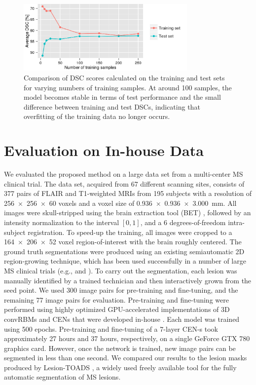 \begin{figure}[tb]
\centering
\includegraphics[width=0.78\textwidth]{figures/MICCAI2015_train_count}

\caption[Comparison of DSC scores calculated on the training and test sets for
varying numbers of training samples]{Comparison of DSC scores calculated on the training and test sets for
varying numbers of training samples. At around 100 samples, the model becomes
stable in terms of test performance and the small difference between training
and test DSCs, indicating that overfitting of the training data no longer
occurs.}
\label{fig:bioms}
\end{figure}

\section{Evaluation on In-house Data}

We evaluated the proposed method on a large data set from a multi-center MS
clinical trial. The data set, acquired from 67 different scanning sites,
consists of 377 pairs of FLAIR and T1-weighted MRIs from 195 subjects with a
resolution of \num{256x256x60} voxels and a voxel size of
\SI{0.936x0.936x3.000}{\milli\metre}. All images were skull-stripped using the
brain extraction tool (BET) \cite{jenkinson2005bet2}, followed by an intensity
normalization to the interval $[0,1]$, and a 6 degrees-of-freedom intra-subject
registration. To speed-up the training, all images were cropped to a
\num{164x206x52} voxel region-of-interest with the brain roughly centered. The
ground truth segmentations were produced using an existing semiautomatic 2D
region-growing technique, which has been used successfully in a number of large
MS clinical trials (e.g., \cite{kappos2006long} and
\cite{traboulsee2008reduction}). To carry out the segmentation, each lesion was
manually identified by a trained technician and then interactively grown from
the seed point. We used 300 image pairs for pre-training and fine-tuning, and
the remaining 77 image pairs for evaluation. Pre-training and fine-tuning were
performed using highly optimized GPU-accelerated implementations of 3D convRBMs
and CENs that were developed in-house \cite{brosch2014efficient}. Each model was
trained using 500 epochs. Pre-training and fine-tuning of a 7-layer CEN-s took
approximately 27 hours and 37 hours, respectively, on a single GeForce GTX 780
graphics card. However, once the network is trained, new image pairs can be
segmented in less than one second. We compared our results to the lesion masks
produced by Lesion-TOADS \cite{shiee2010topology}, a widely used freely
available tool for the fully automatic segmentation of MS lesions.

